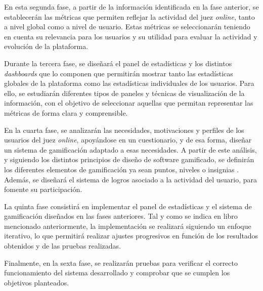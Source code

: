 En esta segunda fase, a partir de la información identificada en la fase anterior, se establecerán las métricas que permiten reflejar la actividad del juez \textit{online}, tanto a nivel global como a nivel de usuario. Estas métricas se seleccionarán teniendo en cuenta su relevancia para los usuarios y su utilidad para evaluar la actividad y evolución de la plataforma. 

Durante la tercera fase, se diseñará el panel de estadísticas y los distintos \textit{dashboards} que lo componen que permitirán mostrar tanto las estadísticas globales de la plataforma como las estadísticas individuales de los usuarios. Para ello, se estudiarán diferentes tipos de paneles y técnicas de visualización de la información, con el objetivo de seleccionar aquellas que permitan representar las métricas de forma clara y comprensible. 

En la cuarta fase, se analizarán las necesidades, motivaciones y perfiles de los usuarios del juez \textit{online}, apoyándose en un cuestionario, y de esa forma, diseñar un sistema de gamificación adaptado a esas necesidades. A partir de este análisis, y siguiendo los distintos principios de diseño de software gamificado, se definirán los diferentes elementos de gamificación ya sean puntos, niveles o insignias \cite{Zichermann_Cunningham_2011}. Además, se diseñará el sistema de logros asociado a la actividad del usuario, para fomente su participación.

La quinta fase consistirá en implementar el panel de estadísticas y el sistema de gamificación diseñados en las fases anteriores. Tal y como se indica en libro mencionado anteriormente, la implementación se realizará siguiendo un enfoque iterativo, lo que permitirá realizar ajustes progresivos en función de los resultados obtenidos y de las pruebas realizadas. 

Finalmente, en la sexta fase, se realizarán pruebas para verificar el correcto funcionamiento del sistema desarrollado y comprobar que se cumplen los objetivos planteados. 